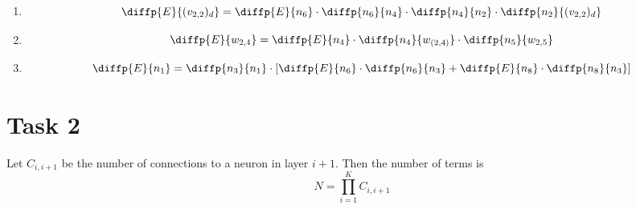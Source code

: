 \documentclass[9pt]{paper}
\begin{document}
\begin{enumerate}

\item
\begin{equation*}
\diffp{E}{{(v_{2,2})_d}} = \diffp{E}{{n_6}} \cdot \diffp{{n_6}}{{n_4}} \cdot \diffp{{n_4}}{{n_2}} \cdot \diffp{{n_2}}{{(v_{2,2})_d}}
\end{equation*}

\item
\begin{equation*}
\diffp{E}{{w_{2,4}}} = \diffp{E}{{n_4}} \cdot \diffp{{n_4}}{{w_{(2,4)}}} \cdot \diffp{{n_5}}{{w_{2,5}}}
\end{equation*}

\item
\begin{equation*}
\diffp{E}{{n_1}} = \diffp{n_3}{{n_1}} \cdot \left[\diffp{E}{{n_6}} \cdot \diffp{n_6}{{n_3}} + \diffp{E}{{n_8}} \cdot \diffp{n_8}{{n_3}} \right]
\end{equation*}

\end{enumerate}

\section*{Task 2}

Let $C_{i, i+1}$ be the number of connections to a neuron in layer $i+1$. Then the number of terms is
\begin{equation*}
N = {\prod_{i=1}^{K} C_{i,i+1}}
\end{equation*}
\end{document}
